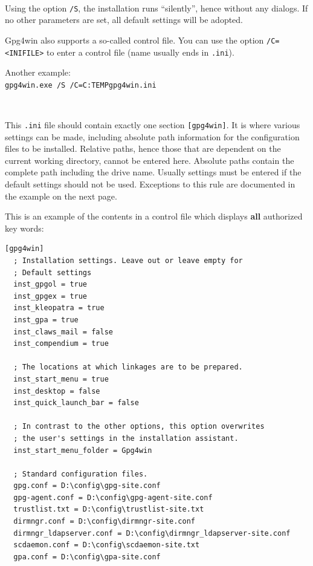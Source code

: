\documentclass[a4paper,11pt,oneside,openright,titlepage]{scrbook}
\newcommand{\Filename}[1]{\small{\texttt{#1}}\normalsize}
\begin{document}
~\\Using the option \Filename{/S}, the installation runs ``silently'',
hence without any dialogs. If no other parameters are set, all default
settings will be adopted.

Gpg4win also supports a so-called control file. You can use the option
\Filename{/C=<INIFILE>} to enter a control file (name usually ends in
\Filename{.ini}).

Another example:\\
\Filename{gpg4win.exe /S /C=C:\back{}TEMP\back{}gpg4win.ini}

~\\


This \Filename{.ini} file should contain exactly one section
\Filename{[gpg4win]}. It is where various settings can be made,
including absolute path information for the configuration files to be
installed. Relative paths, hence those that are dependent on the
current working directory, cannot be entered here. Absolute paths
contain the complete path including the drive name. Usually settings
must be entered if the default settings should not be used. Exceptions
to this rule are documented in the example on the next page.


\clearpage
This is an example of the contents in a control file which displays
\textbf{all} authorized key words:

\begin{verbatim}
[gpg4win]
  ; Installation settings. Leave out or leave empty for
  ; Default settings
  inst_gpgol = true
  inst_gpgex = true
  inst_kleopatra = true
  inst_gpa = true
  inst_claws_mail = false
  inst_compendium = true

  ; The locations at which linkages are to be prepared.
  inst_start_menu = true
  inst_desktop = false
  inst_quick_launch_bar = false

  ; In contrast to the other options, this option overwrites
  ; the user's settings in the installation assistant.
  inst_start_menu_folder = Gpg4win

  ; Standard configuration files.
  gpg.conf = D:\config\gpg-site.conf
  gpg-agent.conf = D:\config\gpg-agent-site.conf
  trustlist.txt = D:\config\trustlist-site.txt
  dirmngr.conf = D:\config\dirmngr-site.conf
  dirmngr_ldapserver.conf = D:\config\dirmngr_ldapserver-site.conf
  scdaemon.conf = D:\config\scdaemon-site.txt
  gpa.conf = D:\config\gpa-site.conf
\end{verbatim}
\end{document}
